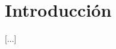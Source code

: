 \pagestyle{fancy}
\fancyhead[l]{\autorUO}
\fancyfoot[l]{\asignaturaAbbr}
\fancyfoot[r]{\fecha}

\section{Introducción} \label{sec:intro}
[...]